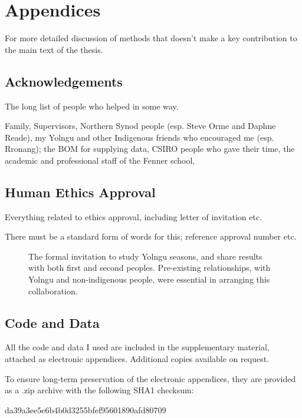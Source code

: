 \chapter{Appendices}
For more detailed discussion of methods that doesn't make a key contribution to the main text of the thesis.

\section{Acknowledgements}
The long list of people who helped in some way.

Family, Supervisors, Northern Synod people (esp. Steve Orme and Daphne Reade),
my Yolngu and other Indigenous friends who encouraged me (esp. Rronang);
the BOM for supplying data, CSIRO people who gave their time,
the academic and professional staff of the Fenner school,


\section{Human Ethics Approval} \label{sec:ethics}
Everything related to ethics approval, including letter of invitation etc.

There must be a standard form of words for this; reference approval number etc.

\begin{figure}[p]
    \centering
    \caption[Letter of invitation for collaborative research]{
        The formal invitation to study Yolngu seasons,
        and share results with both first and second peoples.
        Pre-existing relationships, with Yolngu and non-indigenous people,
        were essential in arranging this collaboration.
        }
    \label{app:invitation-letter}
\end{figure}


\section{Code and Data} \label{sec:appendix-code}
All the code and data I used are included in the supplementary material,
attached as electronic appendices.  Additional copies available on request.

To ensure long-term preservation of the electronic appendices, they
are provided as a .zip archive with the following SHA1 checksum:

da39a3ee5e6b4b0d3255bfef95601890afd80709

